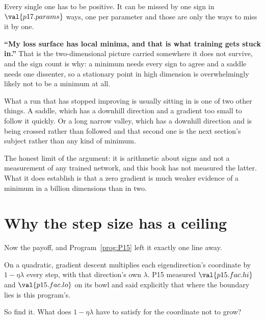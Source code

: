 \begin{fr}
\begin{ansblock}
Every single one has to be positive. It can be missed by one sign in
$\val{p17.params}$ ways, one per parameter \dash{} and those are only the
ways to miss it by one.
\end{ansblock}

\begin{trapbox}
\textbf{\enquote{My loss surface has local minima, and that is what training
gets stuck in.}} That is the two-dimensional picture carried somewhere it does
not survive, and the sign count is why: a minimum needs every sign to agree
and a saddle needs one dissenter, so a stationary point in high dimension is
overwhelmingly likely not to be a minimum at all.

What a run that has stopped improving is usually sitting in is one of two
other things. A saddle, which has a downhill direction and a gradient too
small to follow it quickly. Or a long narrow valley, which has a downhill
direction and is being crossed rather than followed \dash{} and that second
one is the next section's subject rather than any kind of minimum.

The honest limit of the argument: it is arithmetic about signs and not a
measurement of any trained network, and this book has not measured the latter.
What it does establish is that a zero gradient is much weaker evidence of a
minimum in a billion dimensions than in two.
\end{trapbox}
\end{fr}

\section{Why the step size has a ceiling}
\label{sec:P17-stepsize}

\begin{fr}
Now the payoff, and Program~\ref{prog:P15} left it exactly one line away.

On a quadratic, gradient descent multiplies each eigendirection's coordinate
by $1 - \eta\lambda$ every step, with that direction's own $\lambda$. P15
measured $\val{p15.fac.hi}$ and $\val{p15.fac.lo}$ on its bowl and said
explicitly that where the boundary lies is this program's.

So find it. What does $1 - \eta\lambda$ have to satisfy for the coordinate not
to grow?
\dotline
\nextframe
\end{fr}

